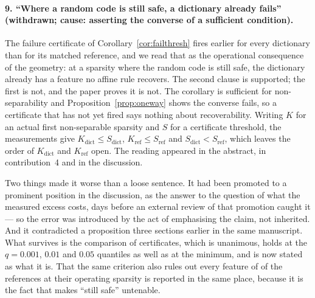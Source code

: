 \paragraph{9. ``Where a random code is still safe, a dictionary already fails'' (withdrawn; cause:
asserting the converse of a sufficient condition).} The failure certificate of
Corollary~\ref{cor:failthresh} fires earlier for every dictionary than for its matched reference,
and we read that as the operational consequence of the geometry: at a sparsity where the random code
is still safe, the dictionary already has a feature no affine rule recovers. The second clause is
supported; the first is not, and the paper proves it is not. The corollary is sufficient for
non-separability and Proposition~\ref{prop:oneway} shows the converse fails, so a certificate that
has not yet fired says nothing about recoverability. Writing $K$ for an actual first
non-separable sparsity and $S$ for a certificate threshold, the measurements give
$K_{\text{dict}}\le S_{\text{dict}}$, $K_{\text{ref}}\le S_{\text{ref}}$ and
$S_{\text{dict}}<S_{\text{ref}}$, which leaves the order of $K_{\text{dict}}$ and $K_{\text{ref}}$
open. The reading appeared in the abstract, in contribution~4 and in the discussion.

Two things made it worse than a loose sentence. It had been promoted to a prominent position in the
discussion, as the answer to the question of what the measured excess costs, days before an external
review of that promotion caught it --- so the error was introduced by the act of emphasising the
claim, not inherited. And it contradicted a proposition three sections earlier in the same
manuscript. What survives is the comparison of certificates, which is unanimous, holds at the
$q=0.001$, $0.01$ and $0.05$ quantiles as well as at the minimum, and is now stated as what it is.
That the same criterion also rules out every feature of \SaeFailCtlAllRuledOut{} of the
\SaeFailRefs{} references at their operating sparsity is reported in the same place, because it is
the fact that makes ``still safe'' untenable.

